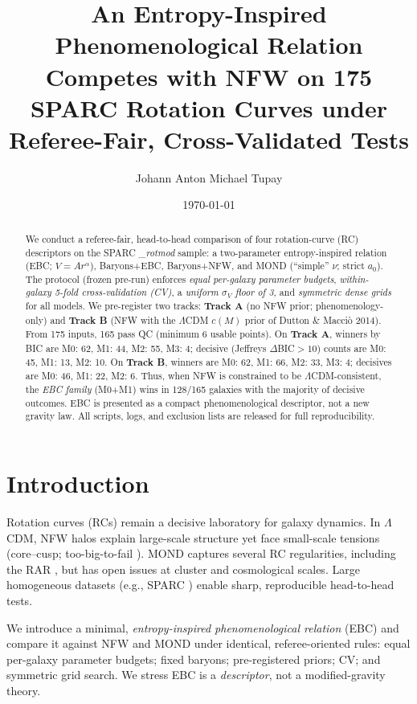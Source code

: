\documentclass[12pt]{article}
\title{\textbf{An Entropy-Inspired Phenomenological Relation Competes with NFW on 175 SPARC Rotation Curves under Referee-Fair, Cross-Validated Tests}}
\author[1]{Johann Anton Michael Tupay}
\affil[1]{London, United Kingdom}
\date{\today}
\begin{document}
\maketitle

\begin{abstract}
We conduct a referee-fair, head-to-head comparison of four rotation-curve (RC) descriptors on the SPARC \emph{\_rotmod} sample: a two-parameter entropy-inspired relation (EBC; $V=Ar^\alpha$), Baryons+EBC, Baryons+NFW, and MOND (``simple'' $\nu$; strict $a_0$). The protocol (frozen pre-run) enforces \emph{equal per-galaxy parameter budgets}, \emph{within-galaxy 5-fold cross-validation (CV)}, a \emph{uniform $\sigma_V$ floor of \SI{3}{\kms}}, and \emph{symmetric dense grids} for all models. We pre-register two tracks: \textbf{Track A} (no NFW prior; phenomenology-only) and \textbf{Track B} (NFW with the $\Lambda$CDM $c(M)$ prior of Dutton \& Macci\`o 2014). From 175 inputs, 165 pass QC (minimum 6 usable points). On \textbf{Track A}, winners by BIC are M0: 62, M1: 44, M2: 55, M3: 4; decisive (Jeffreys $\Delta$BIC$>10$) counts are M0: 45, M1: 13, M2: 10. On \textbf{Track B}, winners are M0: 62, M1: 66, M2: 33, M3: 4; decisives are M0: 46, M1: 22, M2: 6. Thus, when NFW is constrained to be $\Lambda$CDM-consistent, the \emph{EBC family} (M0+M1) wins in 128/165 galaxies with the majority of decisive outcomes. EBC is presented as a compact phenomenological descriptor, not a new gravity law. All scripts, logs, and exclusion lists are released for full reproducibility.
\end{abstract}

\section{Introduction}
Rotation curves (RCs) remain a decisive laboratory for galaxy dynamics. In $\Lambda$CDM, NFW halos explain large-scale structure \citep{NFW1996,NFW1997,Planck2018} yet face small-scale tensions (core--cusp; too-big-to-fail \citep{deBlok2001,Gentile2004,Oman2015}). MOND \citep{Milgrom1983,McGaugh2020} captures several RC regularities, including the RAR \citep{McGaugh2016RAR}, but has open issues at cluster and cosmological scales. Large homogeneous datasets (e.g., SPARC \citep{Lelli2016SPARC}) enable sharp, reproducible head-to-head tests.

We introduce a minimal, \emph{entropy-inspired phenomenological relation} (EBC) and compare it against NFW and MOND under identical, referee-oriented rules: equal per-galaxy parameter budgets; fixed baryons; pre-registered priors; CV; and symmetric grid search. We stress EBC is a \emph{descriptor}, not a modified-gravity theory.
\end{document}

